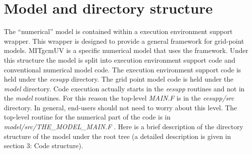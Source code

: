 \section{Model and directory structure}

The ``numerical'' model is contained within a execution environment support
wrapper. This wrapper is designed to provide a general framework for
grid-point models. MITgcmUV is a specific numerical model that uses the
framework. Under this structure the model is split into execution
environment support code and conventional numerical model code. The
execution environment support code is held under the \textit{eesupp}
directory. The grid point model code is held under the \textit{model}
directory. Code execution actually starts in the \textit{eesupp} routines
and not in the \textit{model} routines. For this reason the top-level 
\textit{MAIN.F} is in the \textit{eesupp/src} directory. In general,
end-users should not need to worry about this level. The top-level routine
for the numerical part of the code is in \textit{model/src/THE\_MODEL\_MAIN.F%
}. Here is a brief description of the directory structure of the model under
the root tree (a detailed description is given in section 3: Code structure).

